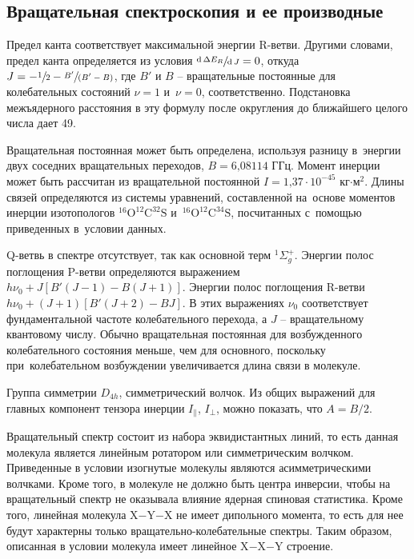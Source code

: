 \subsection{Вращательная спектроскопия и ее производные}
 Предел канта соответствует максимальной энергии R-ветви. Другими словами, предел канта определяется из условия $\sfrac{\text{d}\,\Delta E_R}{\text{d}\,J}= 0$, откуда $J = -\sfrac{1}{2}-\sfrac{B'}{(B'-B)}$, где $B'$ и $B$ – вращательные постоянные для колебательных состояний $\nu=1$ и~$\nu=0$, соответственно. Подстановка межъядерного расстояния в эту формулу после округления до ближайшего целого числа дает 49.\par
{} Вращательная постоянная может быть определена, используя разницу в~энергии двух соседних вращательных переходов, $B=\text{6,08114}$ ГГц. Момент инерции может быть рассчитан из вращательной постоянной $I=\text{1,37}\cdot\text{10}^{-\text{45}}$ кг$\cdot$м$^2$. Длины связей определяются из системы уравнений, составленной на~основе моментов инерции изотопологов $^{16}\text{O}^{12}\text{C}^{32}\text{S}$ и~$^{16}\text{O}^{12}\text{C}^{34}\text{S}$, посчитанных с~помощью приведенных в~условии данных.\par
{} Q-ветвь в спектре отсутствует, так как основной терм $^1\Sigma^+_g$. Энергии полос поглощения P-ветви определяются выражением $h\nu_0 + J\left[ B'(J-1) - B(J+1)\right]$. Энергии полос поглощения R-ветви $h\nu_0 + (J + 1)\left[ B'(J+2) - BJ\right]$. В этих выражениях $\nu_0$ соответствует фундаментальной частоте колебательного перехода, а $J$ – вращательному квантовому числу. Обычно вращательная постоянная для возбужденного колебательного состояния меньше, чем для основного, поскольку при~колебательном возбуждении увеличивается длина связи в молекуле.\par
{} Группа симметрии $D_{4h}$, симметрический волчок. Из общих выражений для главных компонент тензора инерции $I_\parallel$, $I_\perp$, можно показать, что $A=B/2$.\par
{} Вращательный спектр состоит из набора эквидистантных линий, то есть данная молекула является линейным ротатором или симметрическим волчком. Приведенные в условии изогнутые молекулы являются асимметрическими волчками. Кроме того, в молекуле не должно быть центра инверсии, чтобы на вращательный спектр не оказывала влияние ядерная спиновая статистика. Кроме того, линейная молекула X$-$Y$-$X не имеет дипольного момента, то есть для нее будут характерны только вращательно-колебательные спектры. Таким образом, описанная в условии молекула имеет линейное X$-$X$-$Y строение.\par

